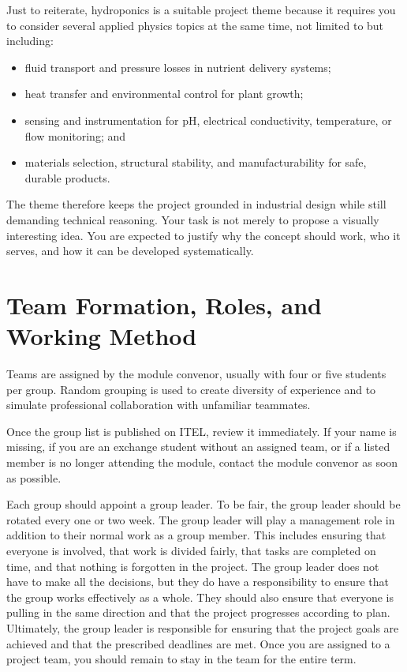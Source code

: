 Just to reiterate, hydroponics is a suitable project theme because it requires you to consider several applied physics topics at the same time, not limited to but including:
\begin{itemize}
    \item fluid transport and pressure losses in nutrient delivery systems;
    \item heat transfer and environmental control for plant growth;
    \item sensing and instrumentation for pH, electrical conductivity, temperature, or flow monitoring; and
    \item materials selection, structural stability, and manufacturability for safe, durable products.
\end{itemize}

The theme therefore keeps the project grounded in industrial design while still demanding technical reasoning. Your task is not merely to propose a visually interesting idea. You are expected to justify why the concept should work, who it serves, and how it can be developed systematically.

\section{Team Formation, Roles, and Working Method}

Teams are assigned by the module convenor, usually with four or five students per group. Random grouping is used to create diversity of experience and to simulate professional collaboration with unfamiliar teammates.

Once the group list is published on ITEL, review it immediately. If your name is missing, if you are an exchange student without an assigned team, or if a listed member is no longer attending the module, contact the module convenor as soon as possible.

Each group should appoint a group leader. To be fair, the group leader should be rotated every one or two week. The group leader will play a management role in addition to their normal work as a group member. This includes ensuring that everyone is involved, that work is divided fairly, that tasks are completed on time, and that nothing is forgotten in the project. The group leader does not have to make all the decisions, but they do have a responsibility to ensure that the group works effectively as a whole. They should also ensure that everyone is pulling in the same direction and that the project progresses according to plan. Ultimately, the group leader is responsible for ensuring that the project goals are achieved and that the prescribed deadlines are met.
Once you are assigned to a project team, you should remain to stay in the team for the entire term.

